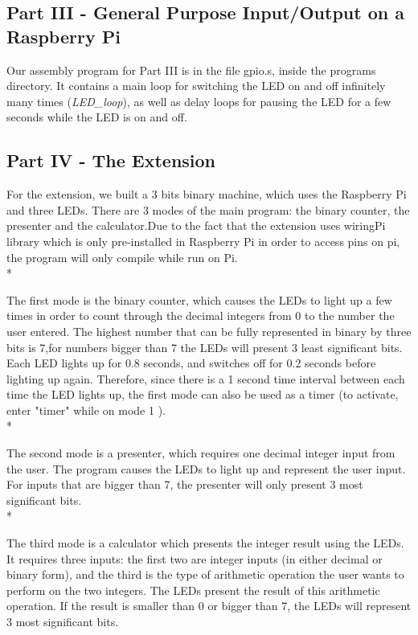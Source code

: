\documentclass[letterpaper,11pt]{article}
\begin{document}
    \subsection{Part III - General Purpose Input/Output on a Raspberry Pi}
    Our assembly program for Part III is in the file gpio.s, inside the programs directory. It contains a main loop for switching the LED on and off infinitely many times (\textit{LED\_loop}), as well as delay loops for pausing the LED for a few seconds while the LED is on and off.
    \subsection{Part IV - The Extension}

    For the extension, we built a 3 bits binary machine, which uses the Raspberry Pi and three LEDs. There are 3 modes of the main program: the binary counter, the presenter and the calculator.Due to the fact that the extension uses wiringPi library which is only pre-installed in Raspberry Pi in order to access pins on pi, the program will only compile while run on Pi.\\*

    \noindent The first mode is the binary counter, which causes the LEDs to light up a few times in order to count through the decimal integers from 0 to the number the user entered. The highest number that can be fully represented in binary by three bits is 7,for numbers bigger than 7 the LEDs will present 3 least significant bits. Each LED lights up for 0.8 seconds, and switches off for 0.2 seconds before lighting up again. Therefore, since there is a 1 second time interval between each time the LED lights up, the first mode can also be used as a timer (to activate, enter "timer" while on mode 1 ). \\*

    \noindent The second mode is a presenter, which requires one decimal integer input from the user. The program causes the LEDs to light up and represent the user input. For inputs that are bigger than 7, the presenter will only present 3 most significant bits.\\*

    \noindent The third mode is a calculator which presents the integer result using the LEDs. It requires three inputs: the first two are integer inputs (in either decimal or binary form), and the third is the type of arithmetic operation the user wants to perform on the two integers. The LEDs present the result of this arithmetic operation. If the result is smaller than 0 or bigger than 7, the LEDs will represent 3 most significant bits.
\end{document}
